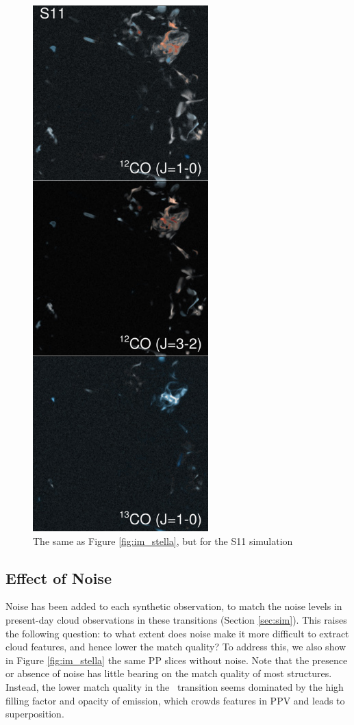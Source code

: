 \begin{figure}[htbp]
\centering
\includegraphics[height=8in]{figures/rahul_im}
\caption{The same as Figure \ref{fig:im_stella}, but for the S11 simulation}
\label{fig:im_rahul}
\end{figure}


\subsection{Effect of Noise}
Noise has been added to each synthetic observation, to match the noise levels in present-day cloud
observations in these transitions (Section \ref{sec:sim}). This raises the following question: to what extent does noise make it more difficult to extract cloud features, and hence lower the match quality? To address this, we also show in Figure \ref{fig:im_stella} the
same PP slices without noise. Note that the presence or absence of noise
has little bearing on the match quality of most structures.  Instead, the lower match quality in the \coa\, transition seems dominated by
the high filling factor and opacity of emission, which crowds features in PPV and leads to superposition.


